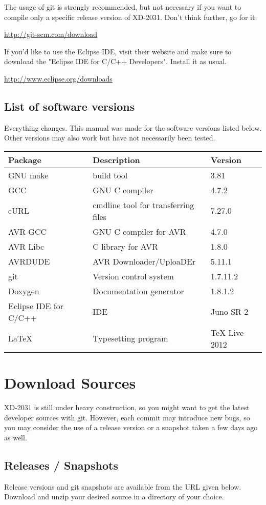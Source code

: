 The usage of git is strongly recommended, but not necessary if you want to
compile only a specific release version of XD-2031. Don't think further, 
go for it: 

\url{http://git-scm.com/download}

If you'd like to use the Eclipse IDE, visit their website  
and make sure to download the "Eclipse IDE for C/C++ Developers". 
Install it as usual.

\url{http://www.eclipse.org/downloads} 

\subsection{List of software versions}
Everything changes. This manual was made for the software versions
listed below. Other versions may also work but have not necessarily been 
tested.

\begin{tabular}[c]{l l l}
\toprule
Package		& Description	& Version \\
\midrule
GNU make 	& build tool			& 3.81 \\
GCC		& GNU C compiler		& 4.7.2 \\
cURL		& cmdline tool for transferring files & 7.27.0 \\
AVR-GCC 	& GNU C compiler for AVR	& 4.7.0 \\
AVR Libc	& C library for AVR		& 1.8.0 \\
AVRDUDE		& AVR Downloader/UploaDEr	& 5.11.1 \\
git				& Version control system 	& 1.7.11.2 \\
Doxygen				& Documentation generator 	& 1.8.1.2 \\
Eclipse IDE for C/C++ 		& IDE				& Juno SR 2 \\
\LaTeX{}			& Typesetting program 		& TeX Live 2012 \\
\bottomrule
\end{tabular}

\section{Download Sources}

XD-2031 is still under heavy construction, so you might want 
to get the latest developer sources with git. However, each commit may
introduce new bugs, so you may consider the use of a release version or
a snapshot taken a few days ago as well.

\subsection{Releases / Snapshots}
Release versions and git snapshots are available from the URL given below. 
Download and unzip your desired source in a directory of your choice.

